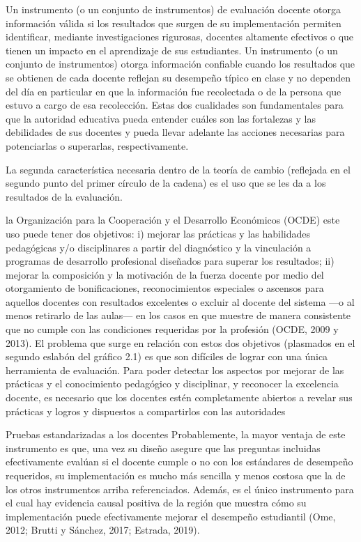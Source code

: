Un instrumento (o un conjunto de instrumentos) de evaluación docente otorga información válida si los resultados que surgen de su implementación permiten identificar, mediante investigaciones rigurosas, docentes altamente efectivos o que tienen un impacto en el aprendizaje de sus estudiantes. Un instrumento (o un conjunto de instrumentos) otorga información confiable cuando los resultados que se obtienen de cada docente reflejan su desempeño típico en clase y no dependen del día en particular en que la información fue recolectada o de la persona que estuvo a cargo de esa recolección. Estas dos cualidades son fundamentales para que la autoridad educativa pueda entender cuáles son las fortalezas y las debilidades de sus docentes y pueda llevar adelante las acciones necesarias para potenciarlas o superarlas, respectivamente.


La segunda característica necesaria dentro de la teoría de cambio (reflejada en el segundo punto del primer círculo de la cadena) es el uso que se les da a los resultados de la evaluación.


la Organización para la Cooperación y el Desarrollo Económicos (OCDE) este uso puede tener dos objetivos: i) mejorar las prácticas y las habilidades pedagógicas y/o disciplinares a partir del diagnóstico y la vinculación a programas de desarrollo profesional diseñados para superar los resultados; ii) mejorar la composición y la motivación de la fuerza docente por medio del otorgamiento de bonificaciones, reconocimientos especiales o ascensos para aquellos docentes con resultados excelentes o excluir al docente del sistema —o al menos retirarlo de las aulas— en los casos en que muestre de manera consistente que no cumple con las condiciones requeridas por la profesión (OCDE, 2009 y 2013).
El problema que surge en relación con estos dos objetivos (plasmados en el segundo eslabón del gráfico 2.1) es que son difíciles de lograr con una única herramienta de evaluación.
Para poder detectar los aspectos por mejorar de las prácticas y el conocimiento pedagógico y disciplinar, y reconocer la excelencia docente, es necesario que los docentes estén completamente abiertos a revelar sus prácticas y logros y dispuestos a compartirlos con las autoridades


Pruebas estandarizadas a los docentes
Probablemente, la mayor ventaja de este instrumento es que, una vez su diseño asegure que las preguntas incluidas efectivamente evalúan si el docente cumple o no con los estándares de desempeño requeridos, su implementación es mucho más sencilla y menos costosa que la de los otros instrumentos arriba referenciados. Además, es el único instrumento para el cual hay evidencia causal positiva de la región que muestra cómo su implementación puede efectivamente mejorar el desempeño estudiantil (Ome, 2012; Brutti y Sánchez, 2017; Estrada, 2019).


